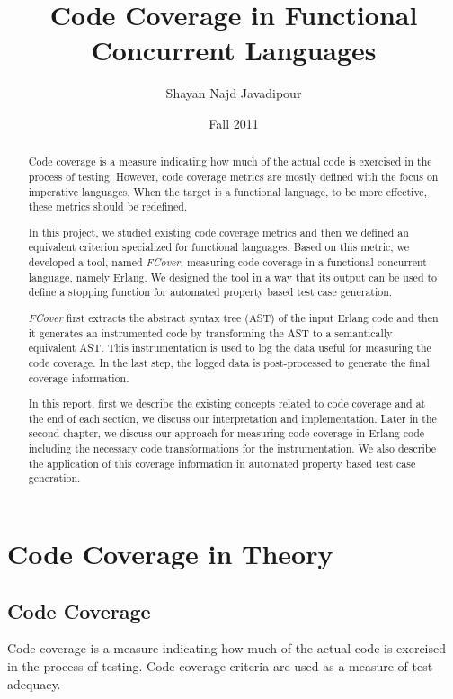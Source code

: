 \documentclass[12pt,a4paper]{report}
\title{Code Coverage in Functional Concurrent Languages}
\author{Shayan Najd Javadipour}
\date{Fall 2011}
\begin{document}
\maketitle
{}
\begin{abstract}
Code coverage is a measure indicating how much of the actual code is exercised in the process of testing. However, code coverage metrics are mostly defined with the focus on imperative languages. When the target is a functional language, to be more effective, these metrics should be redefined.

In this project, we studied existing code coverage metrics and then we defined an equivalent criterion specialized for functional languages. Based on this metric, we developed a tool, named \emph{FCover}, measuring code coverage in a functional concurrent language, namely Erlang. We designed the tool in a way that its output can be used to define a stopping function for automated property based test case generation.

\emph{FCover} first extracts the abstract syntax tree (AST) of the input Erlang code and then it generates an instrumented code by transforming the AST to a semantically equivalent AST. This instrumentation is used to log the data useful for measuring the code coverage. In the last step, the logged data is post-processed to generate the final coverage information.  

In this report, first we describe the existing concepts related to code coverage and at the end of each section, we discuss our interpretation and implementation. Later in the second chapter, we discuss our approach for measuring code coverage in Erlang code including the necessary code transformations for the instrumentation. We also describe the application of this coverage information in automated property based test case generation.
\end{abstract}
\tableofcontents
\chapter{Code Coverage in Theory}
\newpage
\section{Code Coverage}
Code coverage is a measure indicating how much of the actual code is exercised in the process of testing. Code coverage criteria are used as a measure of test adequacy.\cite{Zhu:1997:SUT:267580.267590}
\end{document}
